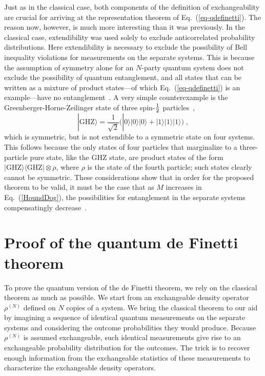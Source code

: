 Just as in the classical case, both components of the definition
of exchangeability are crucial for arriving at the representation
theorem of Eq.~(\ref{eq-qdefinetti}).  The reason now, however, is
much more interesting than it was previously.  In the classical
case, extendibility was used solely to exclude anticorrelated
probability distributions. Here extendibility is necessary to
exclude the possibility of Bell inequality violations for
measurements on the separate systems. This is because the
assumption of symmetry alone for an $N$-party quantum system does
not exclude the possibility of quantum entanglement, and all
states that can be written as a mixture of product states---of
which Eq.~(\ref{eq-qdefinetti}) is an example---have no
entanglement~\cite{Bennett1996}. A very simple counterexample is
the Greenberger-Horne-Zeilinger state of three spin-$1\over2$
particles~\cite{Mermin1990},
\begin{equation}
|\mbox{GHZ}\rangle=\frac{1}{\sqrt{2}}\Big(|0\rangle|0\rangle|0\rangle+
|1\rangle|1\rangle|1\rangle\Big)\;,
\end{equation}
which is symmetric, but is not extendible to a symmetric state on
four systems.  This follows because the only states of four
particles that marginalize to a three-particle pure state, like
the GHZ state, are product states of the form
$|\mbox{GHZ}\rangle\langle\mbox{GHZ}|\otimes\rho$, where $\rho$ is
the state of the fourth particle; such states clearly cannot be
symmetric.  These considerations show that in order for the
proposed theorem to be valid, it must be the case that as $M$
increases in Eq.~(\ref{HoundDog}), the possibilities for
entanglement in the separate systems compensatingly
decrease~\cite{Koashi2000}.

\section{Proof of the quantum de Finetti theorem} \label{sec-proof}

To prove the quantum version of the de Finetti theorem, we rely on
the classical theorem as much as possible.  We start from an
exchangeable density operator $\rho^{(N)}$ defined on $N$ copies
of a system.  We bring the classical theorem to our aid by
imagining a sequence of identical quantum measurements on the
separate systems and considering the outcome probabilities they
would produce.  Because $\rho^{(N)}$ is assumed exchangeable, such
identical measurements give rise to an exchangeable probability
distribution for the outcomes.  The trick is to recover enough
information from the exchangeable statistics of these measurements
to characterize the exchangeable density operators.

